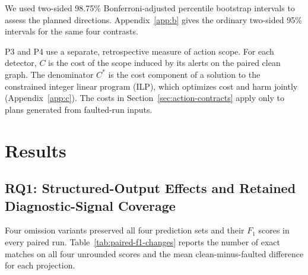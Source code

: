 \documentclass[sn-basic]{sn-jnl}%
\theoremstyle{thmstyleone}%
\theoremstyle{thmstyletwo}%
\theoremstyle{thmstylethree}%
\begin{document}
We used two-sided 98.75\% Bonferroni-adjusted percentile bootstrap intervals to assess the planned directions. Appendix~\ref{app:b} gives the ordinary two-sided 95\% intervals for the same four contrasts.

P3 and P4 use a separate, retrospective measure of action scope. For each detector, \(C\) is the cost of the scope induced by its alerts on the paired clean graph. The denominator \(C^{*}\) is the cost component of a solution to the constrained integer linear program (ILP), which optimizes cost and harm jointly (Appendix~\ref{app:c}). The costs in Section~\ref{sec:action-contracts} apply only to plans generated from faulted-run inputs.

\section{Results}\label{sec:results}

\subsection{RQ1: Structured-Output Effects and Retained Diagnostic-Signal Coverage}
\label{sec:rq1-results}

Four omission variants preserved all four prediction sets and their \(F_1\) scores in every paired run. Table~\ref{tab:paired-f1-changes} reports the number of exact matches on all four unrounded scores and the mean clean-minus-faulted difference for each projection.
\end{document}
